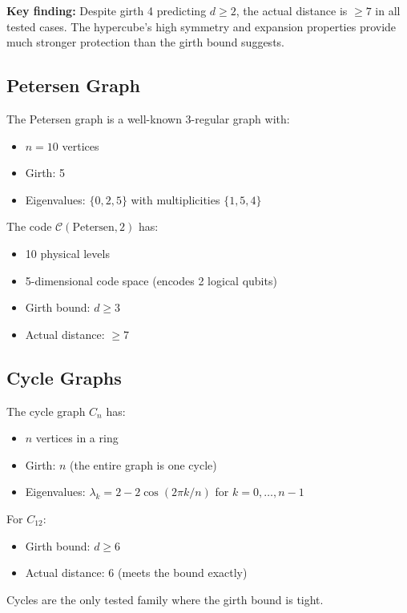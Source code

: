 \documentclass[11pt,a4paper]{article}
\theoremstyle{definition}
\newcommand{\codespace}{\mathcal{C}}
\begin{document}
\textbf{Key finding:} Despite girth 4 predicting $d \geq 2$, the actual distance is $\geq 7$ in all tested cases. The hypercube's high symmetry and expansion properties provide much stronger protection than the girth bound suggests.

\subsection{Petersen Graph}

The Petersen graph is a well-known 3-regular graph with:
\begin{itemize}[noitemsep]
    \item $n = 10$ vertices
    \item Girth: 5
    \item Eigenvalues: $\{0, 2, 5\}$ with multiplicities $\{1, 5, 4\}$
\end{itemize}

The code $\codespace(\text{Petersen}, 2)$ has:
\begin{itemize}[noitemsep]
    \item 10 physical levels
    \item 5-dimensional code space (encodes 2 logical qubits)
    \item Girth bound: $d \geq 3$
    \item Actual distance: $\geq 7$
\end{itemize}

\subsection{Cycle Graphs}

The cycle graph $C_n$ has:
\begin{itemize}[noitemsep]
    \item $n$ vertices in a ring
    \item Girth: $n$ (the entire graph is one cycle)
    \item Eigenvalues: $\lambda_k = 2 - 2\cos(2\pi k/n)$ for $k = 0, \ldots, n-1$
\end{itemize}

For $C_{12}$:
\begin{itemize}[noitemsep]
    \item Girth bound: $d \geq 6$
    \item Actual distance: 6 (meets the bound exactly)
\end{itemize}

Cycles are the only tested family where the girth bound is tight.
\end{document}
